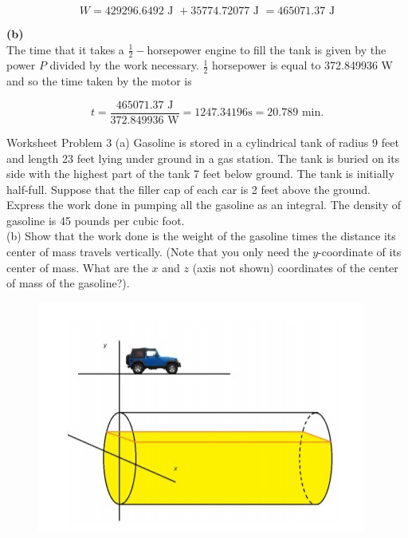 \documentclass{article}
\begin{document}
    \[
        W = 429296.6492 \text{ J } + 35774.72077 \text{ J } = 465071.37 \text{ J}
    \]

    \textbf{(b)} \\
    The time that it takes a $\frac{1}{2}-$horsepower engine to fill the tank is given by the power $P$ divided by the work necessary. $\frac{1}{2}$ horsepower is equal to 372.849936 W and so the time taken by the motor
    is

    \[
        t = \frac{465071.37 \text{ J}}{372.849936 \text{ W}} = 1247.34196 \text{s} = 20.789 \text{ min.}
    \]


    \begin{tbhtheorem}{Worksheet Problem 3}
        (a) Gasoline is stored in a cylindrical tank of radius 9 feet and length 23 feet lying under ground in a gas station. The tank is buried on its side with the highest part of the tank 7 feet below ground. The tank
        is initially half-full. Suppose that the filler cap of each car is 2 feet above the ground. Express the work done in pumping all the gasoline as an integral. The density of gasoline is 45 pounds per cubic foot. \\
        (b) Show that the work done is the weight of the gasoline times the distance its center of mass travels vertically. (Note that you only need the $y$-coordinate of its center of mass. What are the $x$ and $z$
        (axis not shown) coordinates of the center of mass of the gasoline?).
    \end{tbhtheorem}


    \begin{figure}[hbt!]
        \centering
        \includegraphics[scale=0.75]{gas}
    \end{figure}
\end{document}
